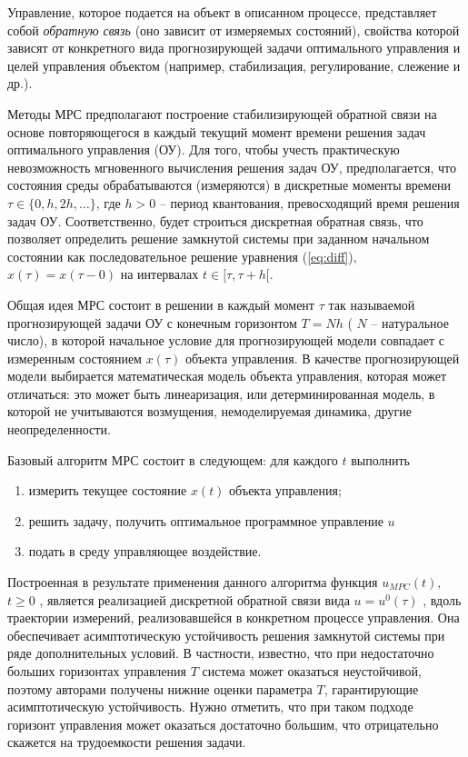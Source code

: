 Управление, которое подается на объект в описанном процессе, представляет собой \textit{обратную связь} (оно зависит от измеряемых состояний), свойства которой зависят от конкретного вида прогнозирующей задачи оптимального управления и целей управления объектом (например, стабилизация, регулирование, слежение и др.).

Методы МРС предполагают построение стабилизирующей обратной связи на основе повторяющегося в каждый текущий момент времени решения задач оптимального управления (ОУ)\cite{mpc}. Для того, чтобы учесть практическую невозможность мгновенного вычисления решения задач ОУ, предполагается, что состояния среды обрабатываются (измеряются) в дискретные моменты времени $\tau \in \{0, h, 2h, \dots\}$, где $h > 0$ – период квантования,
превосходящий время решения задач ОУ. Соответственно, будет строиться дискретная обратная связь, что позволяет определить решение замкнутой системы при заданном начальном состоянии как последовательное решение уравнения
(\ref{eq:diff}), $x(\tau) = x(\tau - 0) $ на интервалах $t \in [\tau, \tau + h[$.

Общая идея МРС состоит в решении в каждый момент $\tau$ так называемой прогнозирующей задачи ОУ с конечным горизонтом $T = Nh$ ( $N$ – натуральное число), в которой начальное условие для прогнозирующей модели совпадает с измеренным состоянием $x(\tau)$ объекта управления. В качестве прогнозирующей модели выбирается математическая модель объекта управления, которая может отличаться: это может быть линеаризация,
или детерминированная модель, в которой не учитываются возмущения, немоделируемая динамика, другие неопределенности. 

Базовый алгоритм МРС состоит в следующем: для каждого $t$ выполнить
\begin{enumerate}
	\item измерить текущее состояние $x(t)$ объекта управления;
	\item решить задачу, получить оптимальное программное управление $u$
	\item подать в среду управляющее воздействие.
\end{enumerate}

Построенная в результате применения данного алгоритма функция 
$u_{MPC} (t),$  $ t \ge 0$ , является реализацией дискретной обратной связи вида $u = u^0(\tau)$ , вдоль траектории измерений, реализовавшейся в конкретном процессе управления.  Она обеспечивает асимптотическую устойчивость решения замкнутой системы при ряде дополнительных условий. В частности, известно, что при недостаточно больших горизонтах управления $T$ система может оказаться неустойчивой, поэтому авторами \cite{mpcIn2} получены нижние оценки параметра $T$, гарантирующие асимптотическую устойчивость. Нужно отметить,
что при таком подходе горизонт управления может оказаться достаточно большим, что отрицательно скажется на трудоемкости решения задачи.

